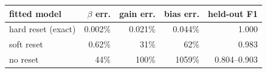 \begin{tabular}{lrrrr}
\toprule
fitted model & $\beta$ err. & gain err. & bias err. & held-out F1\\
\midrule
hard reset (exact) & 0.002\% & 0.021\% & 0.044\% & 1.000\\
soft reset & 0.62\% & 31\% & 62\% & 0.983\\
no reset & 44\% & 100\% & 1059\% & 0.804--0.903\\
\bottomrule
\end{tabular}
